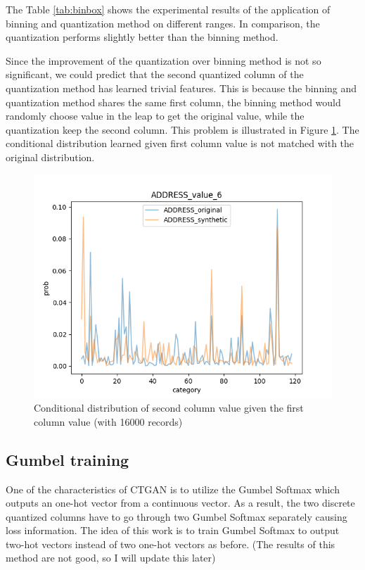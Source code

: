 \documentclass{article}
\begin{document}
The Table \ref{tab:binbox} shows the experimental results of the application of binning and quantization method on different ranges. In comparison, the quantization performs slightly better than the binning method. 

Since the improvement of the quantization over binning method is not so significant, we could predict that the second quantized column of the quantization method has learned trivial features. This is because the binning and quantization method shares the same first column, the binning method would randomly choose value in the leap to get the original value, while the quantization keep the second column. This problem is illustrated in Figure \ref{fig:conadd}. The conditional distribution learned given first column value is not matched with the original distribution.


\begin{figure}[h]
	\centering
	\includegraphics[scale=0.6]{figures/conadd.png}
	\caption{Conditional distribution of second column value given the first column value (with 16000 records)}
	\label{fig:conadd}
\end{figure}

\subsection{Gumbel training}

One of the characteristics of \ac{CTGAN} is to utilize the Gumbel Softmax \cite{jang2016categorical} which outputs an one-hot vector from a continuous vector. As a result, the two discrete quantized columns have to go through two Gumbel Softmax separately causing loss information. The idea of this work is to train Gumbel Softmax to output two-hot vectors instead of two one-hot vectors as before. (The results of this method are not good, so I will update this later)
\end{document}
